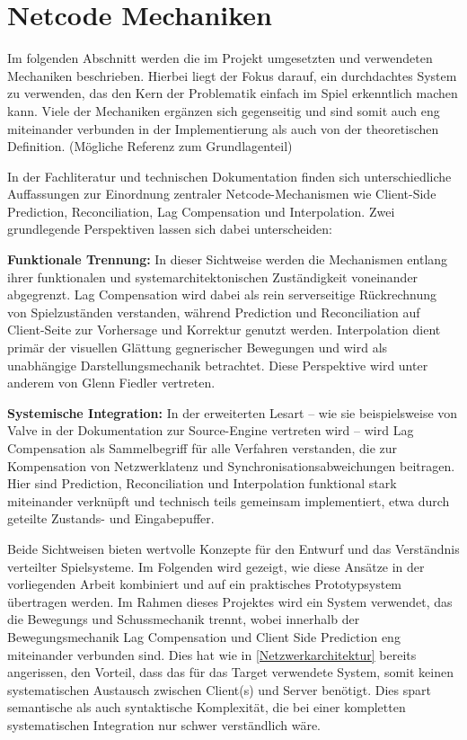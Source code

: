 \chapter{Netcode Mechaniken}
\label{Netcode}
Im folgenden Abschnitt werden die im Projekt umgesetzten und verwendeten Mechaniken beschrieben.
Hierbei liegt der Fokus darauf, ein durchdachtes System zu verwenden, das den Kern der Problematik einfach im Spiel erkenntlich machen kann. 
Viele der Mechaniken ergänzen sich gegenseitig und sind somit auch eng miteinander verbunden in der Implementierung als auch von der theoretischen Definition.
(Mögliche Referenz zum Grundlagenteil)

In der Fachliteratur und technischen Dokumentation finden sich unterschiedliche Auffassungen zur Einordnung zentraler Netcode-Mechanismen wie Client-Side Prediction, Reconciliation, Lag Compensation und Interpolation. Zwei grundlegende Perspektiven lassen sich dabei unterscheiden:


\textbf{Funktionale Trennung:} In dieser Sichtweise werden die Mechanismen entlang ihrer funktionalen und systemarchitektonischen Zuständigkeit voneinander abgegrenzt. Lag Compensation wird dabei als rein serverseitige Rückrechnung von Spielzuständen verstanden, während Prediction und Reconciliation auf Client-Seite zur Vorhersage und Korrektur genutzt werden. Interpolation dient primär der visuellen Glättung gegnerischer Bewegungen und wird als unabhängige Darstellungsmechanik betrachtet. Diese Perspektive wird unter anderem von Glenn Fiedler \cite{fiedlerPrediction} vertreten. \newpage
    
\textbf{Systemische Integration:} In der erweiterten Lesart – wie sie beispielsweise von Valve in der Dokumentation zur Source-Engine \cite{valveLagComp} vertreten wird – wird Lag Compensation als Sammelbegriff für alle Verfahren verstanden, die zur Kompensation von Netzwerklatenz und Synchronisationsabweichungen beitragen. Hier sind Prediction, Reconciliation und Interpolation funktional stark miteinander verknüpft und technisch teils gemeinsam implementiert, etwa durch geteilte Zustands- und Eingabepuffer.


Beide Sichtweisen bieten wertvolle Konzepte für den Entwurf und das Verständnis verteilter Spielsysteme. Im Folgenden wird gezeigt, wie diese Ansätze in der vorliegenden Arbeit kombiniert und auf ein praktisches Prototypsystem übertragen werden.
Im Rahmen dieses Projektes wird ein System verwendet, das die Bewegungs und Schussmechanik trennt, wobei innerhalb der Bewegungsmechanik Lag Compensation und Client Side Prediction eng miteinander verbunden sind. Dies hat wie in \autoref{Netzwerkarchitektur} bereits angerissen, den Vorteil, dass das für das Target verwendete System, somit keinen systematischen Austausch zwischen Client(s) und Server benötigt.
Dies spart semantische als auch syntaktische Komplexität, die bei einer kompletten systematischen Integration nur schwer verständlich wäre. 

